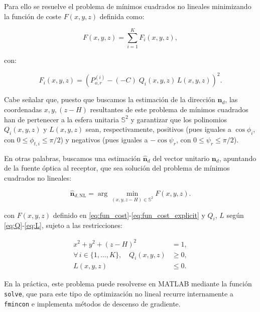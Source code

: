 \documentclass[lettersize,journal]{IEEEtran}
\begin{document}
Para ello se resuelve el problema de mínimos cuadrados no lineales minimizando la función de coste \(F(x,y,z)\) definida como:

\begin{equation}
    F(x,y,z)=\sum_{i=1}^{K} F_i(x,y,z),
    \label{eq:fun_cost}
\end{equation}

con:

\begin{equation}
F_i(x,y,z)=(P_{o,r}^{(i)} - (-C)\;Q_i(x,y,z)\,L(x,y,z))^{2}.
\label{eq:fun_cost_explicit}
\end{equation}



Cabe señalar que, puesto que buscamos la estimación de la dirección $\mathbf{n}_{d}$, las coordenadas $x,y,(z-H)$ resultantes de este problema de mínimos cuadrados han de pertenecer a la esfera unitaria \(\mathbb{S}^2\) y garantizar que los polinomios \(Q_i(x,y,z)\) y \(L(x,y,z)\) sean, respectivamente, positivos (pues iguales a \(\cos\phi_i\), con \(0\le\phi_{t,i}\le\pi/2\)) y negativos (pues iguales a \(-\cos\psi_r\), con \(0\le\psi_r\le\pi/2\)).

En otras palabras, buscamos una estimación $\hat{\mathbf{n}}_d$ del vector unitario ${\mathbf{n}}_d$, apuntando de la fuente óptica al receptor, que sea solución del problema de mínimos cuadrados no lineales:

\begin{equation}
\hat{\mathbf{n}}_{d,\mathrm{NL}}=\arg\min_{(x,y,z-H)\in\mathbb{S}^2}F(x,y,z).
\end{equation}


con $F(x,y,z)$ definido en \ref{eq:fun_cost}-\ref{eq:fun_cost_explicit} y $Q_i$, $L$ según \ref{eq:Q}-\ref{eq:L}, sujeto a las restricciones:

\begin{equation}
\begin{aligned}
x^2 + y^2 + (z-H)^2 &= 1, \\
\forall\,i\in\{1,\dots,K\},\quad Q_i(x,y,z) &\ge 0, \\
L(x,y,z) &\le 0.
\end{aligned}
\end{equation}


En la práctica, este problema puede resolverse en \textsc{MATLAB} mediante la función \texttt{solve}, que para este tipo de optimización no lineal recurre internamente a \texttt{fmincon} e implementa métodos de descenso de gradiente.
\end{document}
